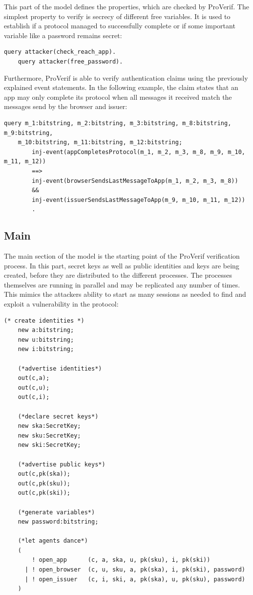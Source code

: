 \documentclass[11pt,twoside,a4paper,openright]{book}
\begin{document}
This part of the model defines the properties, which are checked by ProVerif. The simplest property to verify is secrecy of different free variables. It is used to establish if a protocol managed to successfully complete or if some important variable like a password remains secret:

\begin{Verbatim}[fontsize=\small]
    query attacker(check_reach_app).
    query attacker(free_password).
\end{Verbatim}

Furthermore, ProVerif is able to verify authentication claims using the previously explained event statements. In the following example, the claim states that an app may only complete its protocol when all messages it received match the messages send by the browser and issuer:

\begin{Verbatim}[fontsize=\small]
    query m_1:bitstring, m_2:bitstring, m_3:bitstring, m_8:bitstring, m_9:bitstring,
    m_10:bitstring, m_11:bitstring, m_12:bitstring;
        inj-event(appCompletesProtocol(m_1, m_2, m_3, m_8, m_9, m_10, m_11, m_12))
        ==>
        inj-event(browserSendsLastMessageToApp(m_1, m_2, m_3, m_8))
        &&
        inj-event(issuerSendsLastMessageToApp(m_9, m_10, m_11, m_12))
        .
\end{Verbatim}

\subsection{Main}

The main section of the model is the starting point of the ProVerif verification process. In this part, secret keys as well as public identities and keys are being created, before they are distributed to the different processes. The processes themselves are running in parallel and may be replicated any number of times. This mimics the attackers ability to start as many sessions as needed to find and exploit a vulnerability in the protocol:

\begin{Verbatim}[fontsize=\small]
    (* create identities *)
    new a:bitstring;
    new u:bitstring;
    new i:bitstring;

    (*advertise identities*)
    out(c,a);
    out(c,u);
    out(c,i);

    (*declare secret keys*)
    new ska:SecretKey;
    new sku:SecretKey;
    new ski:SecretKey;

    (*advertise public keys*)
    out(c,pk(ska));
    out(c,pk(sku));
    out(c,pk(ski));

    (*generate variables*)
    new password:bitstring;

    (*let agents dance*)
    (
        ! open_app      (c, a, ska, u, pk(sku), i, pk(ski))
      | ! open_browser  (c, u, sku, a, pk(ska), i, pk(ski), password)
      | ! open_issuer   (c, i, ski, a, pk(ska), u, pk(sku), password)
    )
\end{Verbatim}
\end{document}
